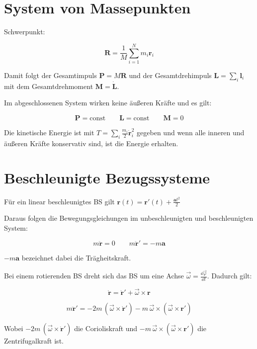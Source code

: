 \newpage
\section{System von Massepunkten}

\begin{frameddefn}
	
	Schwerpunkt: 
	
	\[ \mathbf{R} = \frac{1}{M} \sum_{i=1}^N m_i \mathbf{r}_i \]
	
	Damit folgt der Gesamtimpuls $\mathbf{P} = M \mathbf{R}$ und der Gesamtdrehimpuls $\mathbf{L} = \sum_i \mathbf{l}_i$ mit dem Gesamtdrehmoment $\mathbf{M} = \mathbf{\dot L}$.
	
	Im abgeschlossenen System wirken keine äußeren Kräfte und es gilt:
	
	\[ \mathbf{P} = \textrm{const} \qquad \mathbf{L} = \textrm{const} \qquad \mathbf{M} = 0 \]
	
	Die kinetische Energie ist mit $T = \sum_i \frac{m_i}{2} \mathbf{\dot r}_i^2$ gegeben und wenn alle inneren und äußeren Kräfte konservativ sind, ist die Energie erhalten.
	
\end{frameddefn}

\section{Beschleunigte Bezugssysteme}

\begin{frameddefn}
	
	Für ein linear beschleunigtes BS gilt $\mathbf{r}(t) = \mathbf{r}'(t) + \frac{\mathbf{a} t ^2}{2}$
	
	Daraus folgen die Bewegungsgleichungen im unbeschleunigten und beschleunigten System:
	
	\[ m \mathbf{ \ddot r} = 0 \qquad m \mathbf{\ddot r}' = - m \mathbf{a} \]
	
	$- m \mathbf{a}$ bezeichnet dabei die Trägheitskraft.
	
\end{frameddefn}

\begin{frameddefn}[Rotierendes BS]
	
	Bei einem rotierenden BS dreht sich das BS um eine Achse $\vec{\omega} = \frac{\dd \vec{\varphi}}{\dd t}$. Dadurch gilt:
	
	\[ \mathbf{\dot r} = \mathbf{\dot r}' + \vec{\omega} \times \mathbf{r} \]
	
	\[ m \mathbf{\ddot r}' = -2m \, (\vec{\omega} \times \mathbf{\dot r}') - m \, \vec{\omega} \times (\vec{\omega} \times \mathbf{r}') \]
	
	Wobei $-2m \, (\vec{\omega} \times \mathbf{\dot r}')$ die Corioliskraft und $- m \, \vec{\omega} \times (\vec{\omega} \times \mathbf{r}')$ die Zentrifugalkraft ist.
	
\end{frameddefn}

